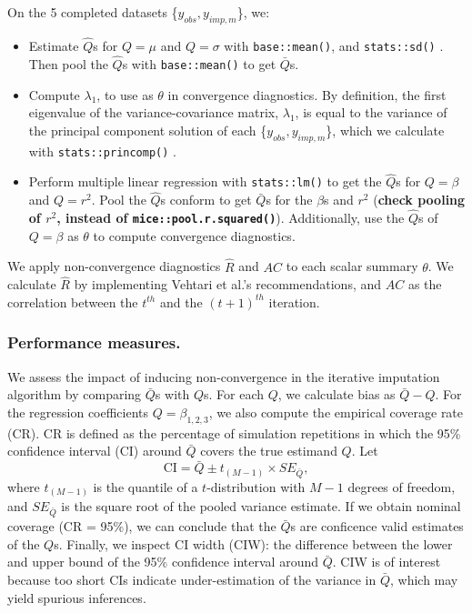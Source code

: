 \documentclass[Royal,times,sageh]{sagej}
\begin{document}
On the 5 completed datasets \{\(y_{obs}, y_{imp, m}\)\}, we:

\begin{itemize}
\item
  Estimate \(\hat{Q}\)s for \(Q= \mu\) and \(Q=\sigma\) with
  \texttt{base::mean()}, and \texttt{stats::sd()} \citep{R}. Then pool
  the \(\hat{Q}\)s with \texttt{base::mean()} to get \(\bar{Q}\)s.
\item
  Compute \(\lambda_1\), to use as \(\theta\) in convergence
  diagnostics. By definition, the first eigenvalue of the
  variance-covariance matrix, \(\lambda_1\), is equal to the variance of
  the principal component solution of each \{\(y_{obs}, y_{imp, m}\)\},
  which we calculate with \texttt{stats::princomp()} \citep{R}.
\item
  Perform multiple linear regression with \texttt{stats::lm()} \citep{R}
  to get the \(\hat{Q}\)s for \(Q=\beta\) and \(Q=r^2\). Pool the
  \(\hat{Q}\)s conform \citet{vink14} to get \(\bar{Q}\)s for the
  \(\beta\)s and \(r^2\) (\textbf{check pooling of \(r^2\), instead of
  \texttt{mice::pool.r.squared()}}). Additionally, use the \(\hat{Q}\)s
  of \(Q=\beta\) as \(\theta\) to compute convergence diagnostics.
\end{itemize}

We apply non-convergence diagnostics \(\widehat{R}\) and \(AC\) to each
scalar summary \(\theta\). We calculate \(\widehat{R}\) by implementing
Vehtari et al.'s \citeyearpar{veht19} recommendations, and \(AC\) as the
correlation between the \(t^{th}\) and the \((t+1)^{th}\) iteration.

\hypertarget{performance-measures.}{%
\subsubsection{Performance measures.}\label{performance-measures.}}

We assess the impact of inducing non-convergence in the iterative
imputation algorithm by comparing \(\bar{Q}\)s with \(Q\)s. For each
\(Q\), we calculate bias as \(\bar{Q} - Q\). For the regression
coefficients \(Q=\beta_{1,2,3}\), we also compute the empirical coverage
rate (CR). CR is defined as the percentage of simulation repetitions in
which the 95\% confidence interval (CI) around \(\bar{Q}\) covers the
true estimand \(Q\). Let
\[\text{CI} = \bar{Q} \pm t_{(M-1)} \times SE_{\bar{Q}},\] where
\(t_{(M-1)}\) is the quantile of a \(t\)-distribution with \(M-1\)
degrees of freedom, and \(SE_{\bar{Q}}\) is the square root of the
pooled variance estimate. If we obtain nominal coverage (CR = 95\%), we
can conclude that the \(\bar{Q}\)s are conficence valid estimates of the
\(Q\)s. Finally, we inspect CI width (CIW): the difference between the
lower and upper bound of the 95\% confidence interval around
\(\bar{Q}\). CIW is of interest because too short CIs indicate
under-estimation of the variance in \(\bar{Q}\), which may yield
spurious inferences.
\end{document}
